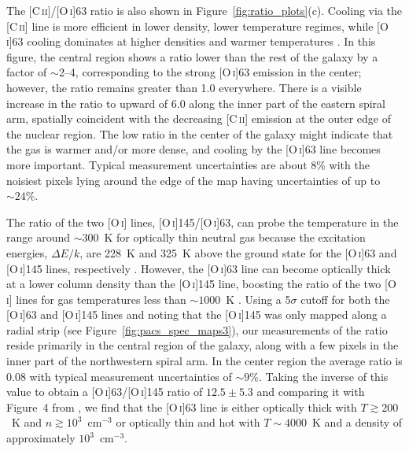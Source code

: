 The [C\,\textsc{ii}]/[O\,\textsc{i}]63 ratio is also shown in Figure~\ref{fig:ratio_plots}(c).  Cooling via the [C\,\textsc{ii}] line is more efficient in lower density, lower temperature regimes, while [O\,\textsc{i}]63 cooling dominates at higher densities and warmer temperatures \citep{1985ApJ...291..722T}.  In this figure, the central region shows a ratio lower than the rest of the galaxy by a factor of $\sim$2--4, corresponding to the strong [O\,\textsc{i}]63 emission in the center; however, the ratio remains greater than 1.0 everywhere.  There is a visible increase in the ratio to upward of 6.0 along the inner part of the eastern spiral arm, spatially coincident with the decreasing [C\,\textsc{ii}] emission at the outer edge of the nuclear region.  The low ratio in the center of the galaxy might indicate that the gas is warmer and/or more dense, and cooling by the [O\,\textsc{i}]63 line becomes more important.  Typical measurement uncertainties are about 8\% with the noisiest pixels lying around the edge of the map having uncertainties of up to $\sim 24$\%.

The ratio of the two [O\,\textsc{i}] lines, [O\,\textsc{i}]145/[O\,\textsc{i}]63, can probe the temperature in the range around $\sim 300$~K for optically thin neutral gas because the excitation energies, $\Delta E/k$, are 228~K and 325~K above the ground state for the [O\,\textsc{i}]63 and [O\,\textsc{i}]145 lines, respectively \citep{1985ApJ...291..722T, 1999ApJ...527..795K, 2001ApJ...561..766M, 2006A&A...446..561L}.  However, the [O\,\textsc{i}]63 line can become optically thick at a lower column density than the [O\,\textsc{i}]145 line, boosting the ratio of the two [O\,\textsc{i}] lines for gas temperatures less than $\sim 1000$~K \citep{1985ApJ...291..722T}.  Using a 5$\sigma$ cutoff for both the [O\,\textsc{i}]63 and [O\,\textsc{i}]145 lines and noting that the [O\,\textsc{i}]145 was only mapped along a radial strip (see Figure~\ref{fig:pacs_spec_maps3}), our measurements of the ratio reside primarily in the central region of the galaxy, along with a few pixels in the inner part of the northwestern spiral arm.  In the center region the average ratio is 0.08 with typical measurement uncertainties of $\sim 9$\%.  Taking the inverse of this value to obtain a [O\,\textsc{i}]63/[O\,\textsc{i}]145 ratio of $12.5 \pm 5.3$ and comparing it with Figure~4 from \citet{2006A&A...446..561L}, we find that the [O\,\textsc{i}]63 line is either optically thick with $T \gtrsim 200$~K and $n \gtrsim 10^{3}$~cm$^{-3}$ or optically thin and hot with $T \sim 4000$~K and a density of approximately $10^{3}$~cm$^{-3}$.

